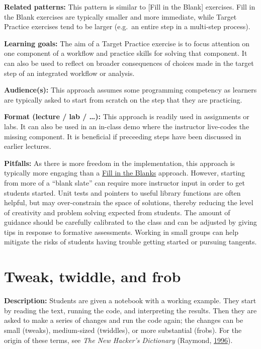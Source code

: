 \documentclass[]{book}
\begin{document}
\textbf{Related patterns:}
This pattern is similar to {[}Fill in the Blank{]} exercises. Fill in the Blank
exercises are typically smaller and more immediate, while Target Practice
exercises tend to be larger (e.g.~an entire step in a multi-step process).

\textbf{Learning goals:}
The aim of a Target Practice exercise is to focus attention on one
component of a workflow and practice skills for solving that component.
It can also be used to reflect on broader consequences of choices made
in the target step of an integrated workflow or analysis.

\textbf{Audience(s):}
This approach assumes some programming competency as learners are
typically asked to start from scratch on the step that they are
practicing.

\textbf{Format (lecture / lab / \ldots):}
This approach is readily used in assignments or labs.
It can also be used in an in-class demo where the instructor live-codes
the missing component. It is beneficial if preceeding steps have been discussed
in earlier lectures.

\textbf{Pitfalls:}
As there is more freedom in the implementation, this approach is typically
more engaging than a \protect\hyperlink{fill-in-the-blanks}{Fill in the Blanks} approach. However, starting from
more of a ``blank slate'' can require more instructor input in order to
get students started. Unit tests and pointers to useful library functions
are often helpful, but may over-constrain the space of solutions, thereby
reducing the level of creativity and problem solving expected from students.
The amount of guidance should be carefully calibrated to the class and can
be adjusted by giving tips in response to formative assessments. Working in
small groups can help mitigate the risks of students having trouble getting
started or pursuing tangents.

\hypertarget{tweak-twiddle-and-frob}{%
\section{Tweak, twiddle, and frob}\label{tweak-twiddle-and-frob}}

\textbf{Description:}
Students are given a notebook with a working example. They start by reading the text,
running the code, and interpreting the results. Then they are asked to make a series of
changes and run the code again; the changes can be small (tweaks), medium-sized (twiddles),
or more substantial (frobs). For the origin of these terms, see
\emph{The New Hacker's Dictionary} (Raymond, \protect\hyperlink{ref-raymond1996new}{1996}).
\end{document}
